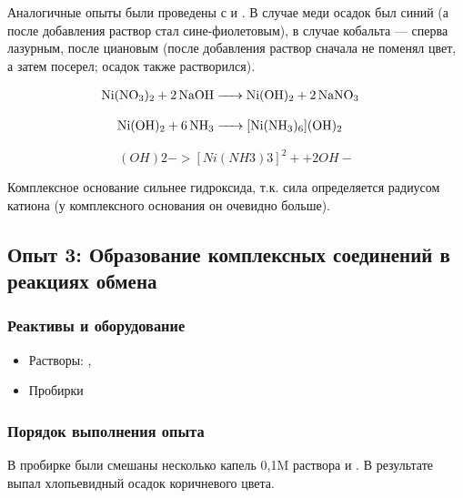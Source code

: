 \documentclass[a4paper, 12pt]{article}
\begin{document}
Аналогичные опыты были проведены с  и . В случае меди осадок был синий (а после добавления  раствор стал сине-фиолетовым), в случае кобальта --- сперва лазурным, после циановым (после добавления  раствор сначала не поменял цвет, а затем посерел; осадок также растворился).

\begin{align}
	\ce{Ni(NO3)2 + 2NaOH &-> Ni(OH)2 + 2NaNO3} %
\end{align}

\begin{align}
	\ce{Ni(OH)2 + 6 NH3 &-> [Ni(NH3)6](OH)2} %
\end{align}

\begin{equation}
	[Ni(NH3)6](OH)2 -> [Ni(NH3)3]^2+ + 2OH-
\end{equation}

Комплексное основание сильнее гидроксида, т.к. сила определяется радиусом катиона (у комплексного основания он очевидно больше).

\subsection{Опыт 3: Образование комплексных соединений в реакциях обмена}

\subsubsection{Реактивы и оборудование}

\begin{itemize}
	\item Растворы: , 
	
	\item Пробирки
\end{itemize}

\subsubsection{Порядок выполнения опыта}

В пробирке были смешаны несколько капель 0,1M раствора  и . В результате выпал хлопьевидный осадок коричневого цвета.
\end{document}
